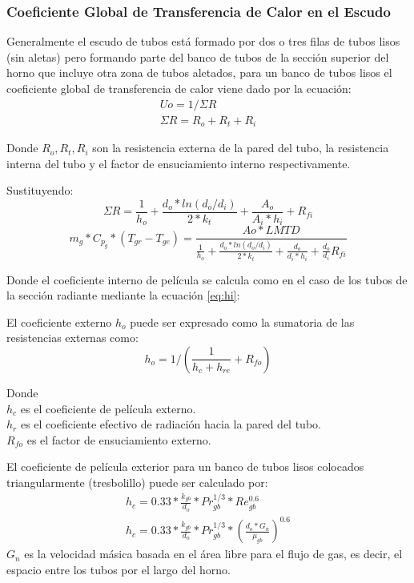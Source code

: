 \subsubsection{Coeficiente Global de Transferencia de Calor en el Escudo}
\par Generalmente el escudo de tubos está formado por dos o tres filas de tubos lisos (sin aletas) pero formando parte del banco de tubos de la sección superior del horno que incluye otra zona de tubos aletados, para un banco de tubos lisos el coeficiente global de transferencia de calor viene dado por la ecuación:
\begin{gather*}
\label{}
Uo  = 1 / \Sigma R \\
\Sigma R = R_o + R_t + R_i
\end{gather*}

\par Donde $R_o, R_t, R_i$ son la resistencia externa de la pared del tubo, la resistencia interna del tubo y el factor de ensuciamiento interno respectivamente.
\par Sustituyendo:
\begin{equation}
\label{}
\Sigma R = \frac{1}{h_o} +\frac{d_o*ln(d_o/d_i)}{2*k_t} +\frac{A_o}{A_i*h_i} +R_{fi}
\end{equation}
\begin{equation}
\label{}
m_{g} *C_{p_g} *(T_{gr} - T_{ge}) = \frac{Ao *LMTD}
{\frac{1}{h_o} +\frac{d_o*ln(d_o/d_i)}{2*k_t} +\frac{d_o}{d_i*h_i} +\frac{d_o}{d_i}R_{fi}}
\end{equation}

\par Donde el coeficiente interno de película se calcula como en el caso de los tubos de la sección radiante mediante la ecuación \ref{eq:hi}:
\par El coeficiente externo $h_o$ puede ser expresado como la sumatoria de las resistencias externas como:
\begin{equation}
\label{eq:ho}
h_o = 1/(\frac{1}{h_c + h_{re}} + R_{fo})
\end{equation}
\par Donde \\
$h_c$ es el coeficiente de película externo.\\
$h_r$ es el coeficiente efectivo de radiación hacia la pared del tubo.\\
$R_{fo}$ es el factor de ensuciamiento externo.\\

\par El coeficiente de película exterior para un banco de tubos lisos colocados triangularmente (tresbolillo) puede ser calculado por:
\begin{equation}
\label{eq:hc}
\begin{gathered}
h_c = 0.33 * \frac{k_{gb}}{d_o} *Pr_{gb}^{1/3} *Re_{gb}^{0.6}\\
h_c = 0.33 * \frac{k_{gb}}{d_o} *Pr_{gb}^{1/3} *(\frac{d_o*G_n}{\mu_{gb}})^{0.6}
\end{gathered}
\end{equation}
$G_n$ es la velocidad másica basada en el área libre para el flujo de gas, es decir, el espacio entre los tubos por el largo del horno.

